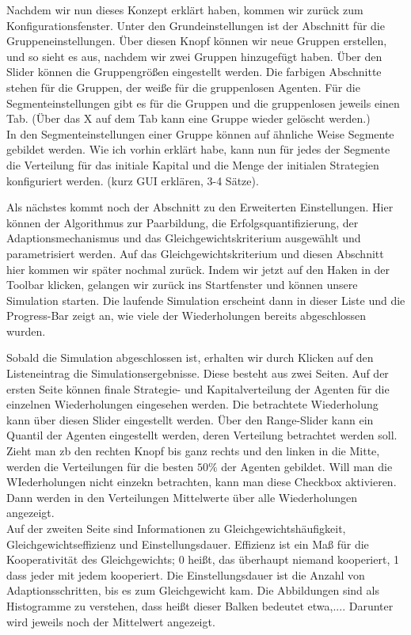 \documentclass[parskip=full,11pt]{scrartcl}
\begin{document}
Nachdem wir nun dieses Konzept erklärt haben, kommen wir zurück zum Konfigurationsfenster. Unter den Grundeinstellungen ist der Abschnitt für die Gruppeneinstellungen. Über diesen Knopf können wir neue Gruppen erstellen, und so sieht es aus, nachdem wir zwei Gruppen hinzugefügt haben. Über den Slider können die Gruppengrößen eingestellt werden. Die farbigen Abschnitte stehen für die Gruppen, der weiße für die gruppenlosen Agenten. Für die Segmenteinstellungen gibt es für die Gruppen und die gruppenlosen jeweils einen Tab. (Über das X auf dem Tab kann eine Gruppe wieder gelöscht werden.)\\
In den Segmenteinstellungen einer Gruppe können auf ähnliche Weise Segmente gebildet werden. Wie ich vorhin erklärt habe, kann nun für jedes der Segmente die Verteilung für das initiale Kapital und die Menge der initialen Strategien konfiguriert werden. (kurz GUI erklären, 3-4 Sätze).

Als nächstes kommt noch der Abschnitt zu den Erweiterten Einstellungen. Hier können der Algorithmus zur Paarbildung, die Erfolgsquantifizierung, der Adaptionsmechanismus und das Gleichgewichtskriterium ausgewählt und parametrisiert werden. Auf das Gleichgewichtskriterium und diesen Abschnitt hier kommen wir später nochmal zurück. Indem wir jetzt auf den Haken in der Toolbar klicken, gelangen wir zurück ins Startfenster und können unsere Simulation starten. Die laufende Simulation erscheint dann in dieser Liste und die Progress-Bar zeigt an, wie viele der Wiederholungen bereits abgeschlossen wurden.

Sobald die Simulation abgeschlossen ist, erhalten wir durch Klicken auf den Listeneintrag die Simulationsergebnisse. Diese besteht aus zwei Seiten. Auf der ersten Seite können finale Strategie- und Kapitalverteilung der Agenten für die einzelnen Wiederholungen eingesehen werden. Die betrachtete Wiederholung kann über diesen Slider eingestellt werden. Über den Range-Slider kann ein Quantil der Agenten eingestellt werden, deren Verteilung betrachtet werden soll. Zieht man zb den rechten Knopf bis ganz rechts und den linken in die Mitte, werden die Verteilungen für die besten \(50\%\) der Agenten gebildet. Will man die WIederholungen nicht einzekn betrachten, kann man diese Checkbox aktivieren. Dann werden in den Verteilungen Mittelwerte über alle Wiederholungen angezeigt.\\
Auf der zweiten Seite sind Informationen zu Gleichgewichtshäufigkeit, Gleichgewichtseffizienz und Einstellungsdauer. Effizienz ist ein Maß für die Kooperativität des Gleichgewichts; 0 heißt, das überhaupt niemand kooperiert, 1 dass jeder mit jedem kooperiert. Die Einstellungsdauer ist die Anzahl von Adaptionsschritten, bis es zum Gleichgewicht kam. Die Abbildungen sind als Histogramme zu verstehen, dass heißt dieser Balken bedeutet etwa,.... Darunter wird jeweils noch der Mittelwert angezeigt.
\end{document}
